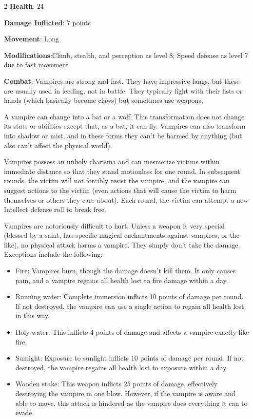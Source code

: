 \begin{multicols}{2}
\textbf{Health}: 24

\textbf{Damage Inflicted}: 7 points

\textbf{Movement}: Long

\textbf{Modifications}:Climb, stealth, and perception as level 8; Speed defense as level 7 due to fast movement

\textbf{Combat}: Vampires are strong and fast. They have impressive fangs, but these are usually used in feeding, not in battle. They typically fight with their fists or hands (which basically become claws) but sometimes use weapons.

A vampire can change into a bat or a wolf. This transformation does not change its stats or abilities except that, as a bat, it can fly. Vampires can also transform into shadow or mist, and in these forms they can’t be harmed by anything (but also can’t affect the physical world).

Vampires possess an unholy charisma and can mesmerize victims within immediate distance so that they stand motionless for one round. In subsequent rounds, the victim will not forcibly resist the vampire, and the vampire can suggest actions to the victim (even actions that will cause the victim to harm themselves or others they care about). Each round, the victim can attempt a new Intellect defense roll to break free.

Vampires are notoriously difficult to hurt. Unless a weapon is very special (blessed by a saint, has specific magical enchantments against vampires, or the like), no physical attack harms a vampire. They simply don’t take the damage. Exceptions include the following:

\begin{itemize}
\item Fire: Vampires burn, though the damage doesn’t kill them. It only causes pain, and a vampire regains all health lost to fire damage within a day.
\item Running water: Complete immersion inflicts 10 points of damage per round. If not destroyed, the vampire can use a single action to regain all health lost in this way.
\item Holy water: This inflicts 4 points of damage and affects a vampire exactly like fire.
\item Sunlight: Exposure to sunlight inflicts 10 points of damage per round. If not destroyed, the vampire regains all health lost to exposure within a day.
\item Wooden stake: This weapon inflicts 25 points of damage, effectively destroying the vampire in one blow. However, if the vampire is aware and able to move, this attack is hindered as the vampire does everything it can to evade.
\end{itemize}


\end{multicols}
